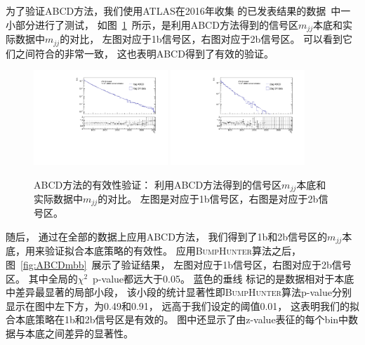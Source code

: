 为了验证ABCD方法，我们使用ATLAS在2016年收集
的已发表结果的数据~\cite{ATLASDijet8,ATLASDijet9}中一小部分进行了测试，
如图~\ref{fig:validationABCD}~所示，是利用ABCD方法得到的信号区$m_{jj}$本底和实际数据中$m_{jj}$的对比，
左图对应于1b信号区，右图对应于2b信号区。
可以看到它们之间符合的非常一致，
这也表明ABCD得到了有效的验证。

\begin{figure}[!ht]
	\centering
	\includegraphics[width=0.45\textwidth]{figuresDijet/04-BackgroundEstimation/1tag_validationABCD.pdf}
	\includegraphics[width=0.45\textwidth]{figuresDijet/04-BackgroundEstimation/2tag_validationABCD.pdf}
	\caption{ABCD方法的有效性验证：
	利用ABCD方法得到的信号区$m_{jj}$本底和实际数据中$m_{jj}$的对比。
	左图是对应于1b信号区，右图是对应于2b信号区。}
	\label{fig:validationABCD}
\end{figure}


随后，
通过在全部的数据上应用ABCD方法，
我们得到了1b和2b信号区的$m_{jj}$本底，用来验证拟合本底策略的有效性。
应用\textsc{BumpHunter}算法之后，图~\ref{fig:ABCDmbb}~展示了验证结果，
左图对应于1b信号区，右图对应于2b信号区。
其中全局的$\chi^2$~p-value都远大于0.05。
蓝色的垂线
标记的是数据相对于本底中差异最显著的局部小段，
该小段的统计显著性即\textsc{BumpHunter}算法p-value分别显示在图中左下方，为0.49和0.91，
远高于我们设定的阈值0.01，
这表明我们的拟合本底策略在1b和2b信号区是有效的。
图中还显示了由z-value表征的每个bin中数据与本底之间差异的显著性。

